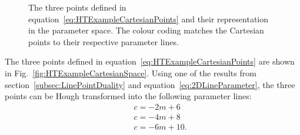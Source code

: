\begin{figure}%
  \centering
  \caption{The three points defined in equation~\ref{eq:HTExampleCartesianPoints} and their representation in the parameter space.  The colour coding matches the Cartesian points to their respective parameter lines.}
  \label{fig:HTExample}
\end{figure}
\newline
\newline
The three points defined in equation~\ref{eq:HTExampleCartesianPoints} are shown in Fig.~\ref{fig:HTExampleCartesianSpace}.  Using one of the results from section~\ref{subsec:LinePointDuality} and equation~\ref{eq:2DLineParameter}, the three points can be Hough transformed into the following parameter lines:
\begin{equation}
  \begin{split}
    &\quad c = -2m + 6 \\
    &\quad c = -4m + 8 \\
    &\quad c = -6m + 10.
  \end{split}
  \label{eq:HTExampleParameterLines}
\end{equation}
